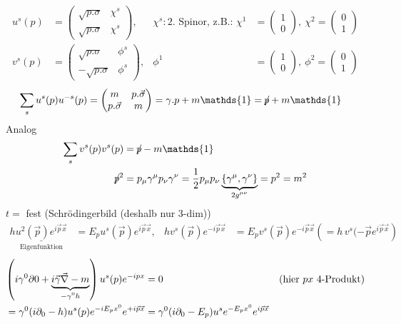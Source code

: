 	\begin{align*}
		u^s (p) &=
		\begin{pmatrix}
			\sqrt{p. \sigma} & \chi^s \\
			\sqrt{p. \sigma} & \chi^s
		\end{pmatrix},&
		\chi^s: \text{2. Spinor, z.B.: } \chi^1 &=
		\begin{pmatrix}
			1 \\ 0
		\end{pmatrix},~
		\chi^2 = 
		\begin{pmatrix}
			0 \\1
		\end{pmatrix}
		\\
		v^s (p) &=
		\begin{pmatrix}
		\sqrt{p. \sigma} & \phi^s \\
		-\sqrt{p. \sigma} & \phi^s
		\end{pmatrix},&
		\phi^1 &=
		\begin{pmatrix}
		1 \\ 0
		\end{pmatrix},~
		\phi^2 = 
		\begin{pmatrix}
		0 \\1
		\end{pmatrix}
	\end{align*}
	\begin{align*}
		\sum_s u^s(p) u^{-s} (p) &= 
		\begin{pmatrix}
			m & p. \vec{\sigma} \\
			p.\vec{\sigma} & m
		\end{pmatrix}
		= \gamma. p + m\mathds{1} = \durch{p} + m\mathds{1}
	\end{align*}
Analog
	\begin{align*}
		\sum_s v^s(p) v^s(p) &= \durch{p} - m\mathds{1}\\
		\durch{p}^2 &= p_\mu \gamma^\mu p_\nu \gamma^\nu = 
		\frac{1}{2} p_\mu p_\nu \underbrace{\{\gamma^\mu, \gamma^\nu\}}_{\mathclap{2g^{\mu\nu}}} = p^2 = m^2
	\end{align*}
$t =$ fest (Schrödingerbild (deshalb nur 3-dim))
	\begin{align*}
		h \underset{\text{Eigenfunktion}}{\underline{u^2(\vec{p}) e^{i \vec{p} \vec{x}}}} &=
		E_p u^s(\vec{p}) e^{i\vec{p} \vec{x}},&
		hv^s(\vec{p}) e^{-i\vec{p} \vec{x}} &= 
		E_p v^s(\vec{p}) e^{-i\vec{p} \vec{x}} 
		\left(
			= h\,v^s(-\vec{p} e^{i\vec{p} \vec{x}}
		\right)
	\end{align*}
	\begin{align*}
		\left(
			i \gamma^0 \partial 0 + \underbrace{i \vec{\gamma} \vec{\nabla} - m}_{\mathclap{-\gamma^0 h}}
		\right) u^s(p) e^{-ipx} &= 0 &(\text{hier } px \text{ 4-Produkt}) \\
		= \gamma^0 (i \partial_0 - h) u^s (p) e^{-i E_p x^0} e^{+ i\vec{p} \vec{x}}
		&= \gamma^0 (i \partial_0 - E_p) u^s e^{-E_p x^0} e^{i \vec{p} \vec{x}}
	\end{align*}
